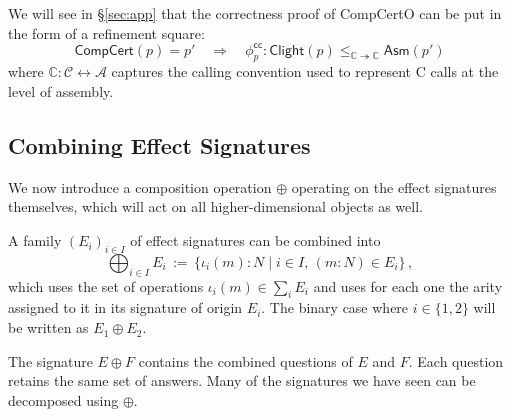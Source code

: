 \documentclass[acmsmall,nonacm]{acmart}
\newcommand{\kw}[1]{\ensuremath{ \mathsf{#1} }}
\begin{document}
\begin{example} %
\label{ex:bq-proof}
We will see in \S\ref{sec:app}
that the correctness proof of CompCertO
can be put in the form of a refinement square:
\[
  \kw{CompCert}(p) = p'
  \quad \Longrightarrow \quad
    \phi^\kw{cc}_p :
      \kw{Clight}(p) \le_{\mathbb{C} \twoheadrightarrow \mathbb{C}} \kw{Asm}(p')
\]
where %
$\mathbb{C} : \mathcal{C} \leftrightarrow \mathcal{A}$
captures the calling convention used %
to represent C calls at the level of assembly.
\end{example}



\subsection{Combining Effect Signatures} \label{sec:fcomp} %

We now introduce
a composition operation $\oplus$ operating on the effect signatures themselves,
which will act on all higher-dimensional objects as well.

\begin{definition}
A family $(E_i)_{i \in I}$ of effect signatures can be combined into
\[
  \bigoplus_{i \in I} E_i \, := \,
    \{ \iota_i(m) \mathbin: N \mid i \in I,\, (m \mathbin: N) \in E_i \}
  \,,
\]
which uses the set of operations $\iota_i(m) \in \sum_i E_i$
and uses for each one the arity assigned to it
in its signature of origin $E_i$.
The binary case where $i \in \{1, 2\}$
will be written as $E_1 \oplus E_2$.
\end{definition}

The signature $E \oplus F$ contains the combined questions of $E$ and $F$.
Each question retains the same set of answers.
Many of the signatures we have seen can be decomposed using $\oplus$.
\end{document}

